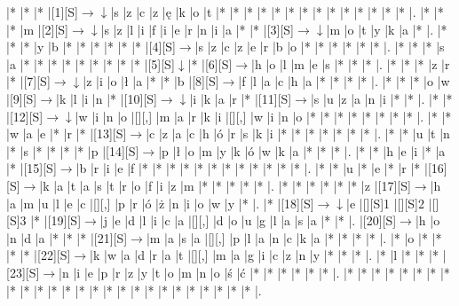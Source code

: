 \documentclass[11pt]{article}
\newcommand\drarr{$\rightarrow \!\!\!\!\! \downarrow$}
\newcommand\rarr{$\rightarrow$}
\newcommand\darr{$\downarrow$}
\begin{document}
\noindent\begin{Puzzle}{25}{16}|*	|*	|*	|[1][S]\drarr	|s	|z	|c	|z	|ę	|k	|o	|t	|*	|*	|*	|*	|*	|*	|*	|*	|*	|*	|*	|*	|*	|*	|.
|*	|*	|*	|m	|[2][S]\drarr	|s	|z	|l	|i	|f	|i	|e	|r	|n	|i	|a	|*	|*	|[3][S]\drarr	|m	|o	|t	|y	|k	|a	|*	|.
|*	|*	|*	|y	|b	|*	|*	|*	|*	|*	|*	|[4][S]\rarr	|s	|z	|c	|z	|e	|r	|b	|o	|*	|*	|*	|*	|*	|*	|.
|*	|*	|*	|s	|a	|*	|*	|*	|*	|*	|*	|*	|*	|*	|[5][S]\darr	|*	|[6][S]\rarr	|h	|o	|l	|m	|e	|s	|*	|*	|*	|.
|*	|*	|*	|z	|r	|*	|[7][S]\drarr	|z	|i	|o	|ł	|a	|*	|*	|b	|[8][S]\rarr	|f	|l	|a	|c	|h	|a	|*	|*	|*	|*	|.
|*	|*	|*	|o	|w	|[9][S]\rarr	|k	|l	|i	|n	|*	|[10][S]\drarr	|i	|k	|a	|r	|*	|[11][S]\rarr	|s	|u	|z	|a	|n	|i	|*	|*	|.
|*	|*	|[12][S]\drarr	|w	|i	|n	|o	|[][,]{ }	|m	|a	|r	|k	|i	|[][,]{ }	|w	|i	|n	|o	|*	|*	|*	|*	|*	|*	|*	|*	|.
|*	|*	|w	|a	|e	|*	|r	|*	|[13][S]\rarr	|c	|z	|a	|c	|h	|ó	|r	|s	|k	|i	|*	|*	|*	|*	|*	|*	|*	|.
|*	|*	|u	|t	|n	|*	|s	|*	|*	|*	|*	|p	|[14][S]\rarr	|p	|ł	|o	|m	|y	|k	|ó	|w	|k	|a	|*	|*	|*	|.
|*	|*	|h	|e	|i	|*	|a	|*	|[15][S]\rarr	|b	|r	|i	|e	|f	|*	|*	|*	|*	|*	|*	|*	|*	|*	|*	|*	|*	|.
|*	|*	|u	|*	|e	|*	|r	|*	|[16][S]\rarr	|k	|a	|t	|a	|s	|t	|r	|o	|f	|i	|z	|m	|*	|*	|*	|*	|*	|.
|*	|*	|*	|*	|*	|*	|z	|[17][S]\rarr	|h	|a	|m	|u	|l	|e	|c	|[][,]{ }	|p	|r	|ó	|ż	|n	|i	|o	|w	|y	|*	|.
|*	|[18][S]\drarr	|e	|[][S]1	|[][S]2	|[][S]3	|*	|[19][S]\rarr	|j	|e	|d	|l	|i	|c	|a	|[][,]{ }	|d	|o	|u	|g	|l	|a	|s	|a	|*	|*	|.
|[20][S]\rarr	|h	|o	|n	|d	|a	|*	|*	|*	|[21][S]\rarr	|m	|a	|s	|a	|[][,]{ }	|p	|l	|a	|n	|c	|k	|a	|*	|*	|*	|*	|.
|*	|o	|*	|*	|*	|*	|[22][S]\rarr	|k	|w	|a	|d	|r	|a	|t	|[][,]{ }	|m	|a	|g	|i	|c	|z	|n	|y	|*	|*	|*	|.
|*	|l	|*	|*	|*	|[23][S]\rarr	|n	|i	|e	|p	|r	|z	|y	|t	|o	|m	|n	|o	|ś	|ć	|*	|*	|*	|*	|*	|*	|.
|*	|*	|*	|*	|*	|*	|*	|*	|*	|*	|*	|*	|*	|*	|*	|*	|*	|*	|*	|*	|*	|*	|*	|*	|*	|*	|.\end{Puzzle}

\newpage
\end{document}
